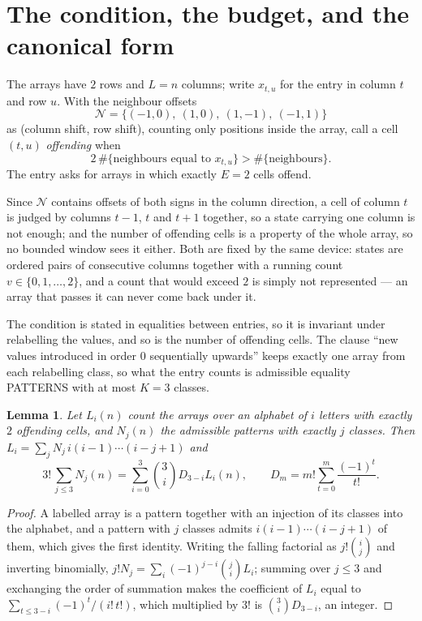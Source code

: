 \documentclass[11pt,a4paper]{article}
\theoremstyle{plain}
\newtheorem{lemma}[theorem]{Lemma}
\theoremstyle{definition}
\begin{document}
\section{The condition, the budget, and the canonical form}

The arrays have $2$ rows and $L=n$ columns; write $x_{t,u}$ for the entry in
column $t$ and row $u$. With the neighbour offsets
\[
\mathcal N=\{(-1,0),\ (1,0),\ (1,-1),\ (-1,1)\}
\]
as (column shift, row shift), counting only positions inside the array, call a cell
$(t,u)$ \emph{offending} when
\[
2\,\#\{\text{neighbours equal to }x_{t,u}\}>\#\{\text{neighbours}\} .
\]
The entry asks for arrays in which exactly $E=2$ cells offend.

Since $\mathcal N$ contains offsets of both signs in the column direction, a cell of column
$t$ is judged by columns $t-1$, $t$ and $t+1$ together, so a state carrying one column is not
enough; and the number of offending cells is a property of the whole array, so no bounded
window sees it either. Both are fixed by the same device: states are ordered pairs of
consecutive columns together with a running count $v\in\{0,1,\dots,2\}$, and a count that
would exceed $2$ is simply not represented --- an array that passes it can never come back
under it.

The condition is stated in equalities between entries, so it is invariant under relabelling
the values, and so is the number of offending cells. The clause ``new values introduced in
order $0$ sequentially upwards'' keeps exactly one array from each relabelling class, so what
the entry counts is admissible equality PATTERNS with at most $K=3$ classes.

\begin{lemma}\label{lem:inv}
Let $L_i(n)$ count the arrays over an alphabet of $i$ letters with exactly $2$ offending
cells, and $N_j(n)$ the admissible patterns with exactly $j$ classes. Then
$L_i=\sum_j N_j\,i(i-1)\cdots(i-j+1)$ and
\[
3!\,\sum_{j\le3}N_j(n)=\sum_{i=0}^{3}\binom{3}{i}D_{3-i}L_i(n),
\qquad D_m=m!\sum_{t=0}^{m}\frac{(-1)^t}{t!} .
\]
\end{lemma}

\begin{proof}
A labelled array is a pattern together with an injection of its classes into the alphabet,
and a pattern with $j$ classes admits $i(i-1)\cdots(i-j+1)$ of them, which gives the first
identity. Writing the falling factorial as $j!\binom{i}{j}$ and inverting binomially,
$j!N_j=\sum_i(-1)^{j-i}\binom{j}{i}L_i$; summing over $j\le3$ and exchanging the
order of summation makes the coefficient of $L_i$ equal to
$\sum_{t\le3-i}(-1)^t/(i!\,t!)$, which multiplied by $3!$ is
$\binom{3}{i}D_{3-i}$, an integer.
\end{proof}
\end{document}
